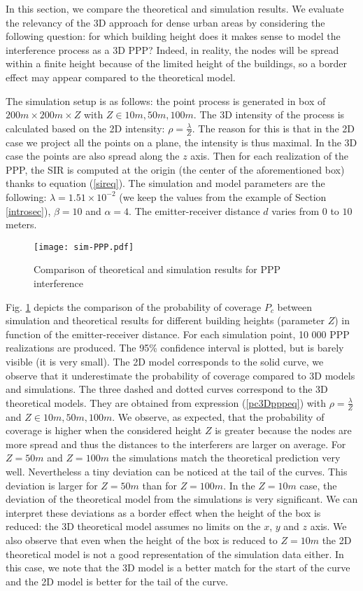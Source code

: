 \documentclass{sig-alternate-05-2015}
\begin{document}
In this section, we compare the theoretical and simulation results. We evaluate the relevancy of the 3D approach for dense urban areas by considering the following question: for which building height does it makes sense to model the interference process as a 3D PPP? Indeed, in reality, the nodes will be spread within a finite height because of the limited height of the buildings, so a border effect may appear compared to the theoretical model.

The simulation setup is as follows: the point process is generated in box of $200m\times 200m \times Z$ with $Z\in {10m,50m,100m}$. The 3D intensity of the process is calculated based on the 2D intensity: $\rho=\frac{\lambda}{Z}$. The reason for this is that in the 2D case we project all the points on a plane, the intensity is thus maximal. In the 3D case the points are also spread along the $z$ axis. Then for each realization of the PPP, the SIR is computed at the origin (the center of the aforementioned box) thanks to equation (\ref{sireq}). The simulation and model parameters are the following: $\lambda=1.51\times 10^{-2}$ (we keep the values from the example of Section \ref{introsec}), $\beta=10$ and $\alpha=4$. The emitter-receiver distance $d$ varies from $0$ to $10$ meters. 

\begin{figure}[ht]
  \centering
  \texttt{[image: sim-PPP.pdf]}
  \caption{Comparison of theoretical and simulation results for PPP interference}
  \label{simpppfig}
\end{figure}

Fig. \ref{simpppfig} depicts the comparison of the probability of coverage $P_c$ between simulation and theoretical results for different building heights (parameter $Z$) in function of the emitter-receiver distance. For each simulation point, 10 000 PPP realizations are produced. The 95\% confidence interval is plotted, but is barely visible (it is very small). The 2D model corresponds to the solid curve, we observe that it underestimate the probability of coverage compared to 3D models and simulations. The three dashed and dotted curves correspond to the 3D theoretical models. They are obtained from expression (\ref{pc3Dpppeq}) with $\rho=\frac{\lambda}{Z}$ and $Z\in {10m,50m,100m}$. We observe, as expected, that the probability of coverage is higher when the considered height $Z$ is greater because the nodes are more spread and thus the distances to the interferers are larger on average. For $Z=50m$ and $Z=100m$ the simulations match the theoretical prediction very well. Nevertheless a tiny deviation can be noticed at the tail of the curves. This deviation is larger for $Z=50m$ than for $Z=100m$. In the $Z=10m$ case, the deviation of the theoretical model from the simulations is very significant. We can interpret these deviations as a border effect when the height of the box is reduced: the 3D theoretical model assumes no limits on the $x$, $y$ and $z$ axis. We also observe that even when the height of the box is reduced to $Z=10m$ the 2D theoretical model is not a good representation of the simulation data either. In this case, we note that the 3D model is a better match for the start of the curve and the 2D model is better for the tail of the curve.
\end{document}

